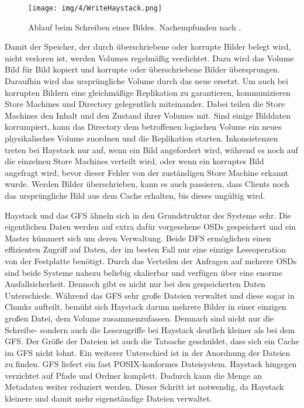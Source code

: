 \documentclass[12pt,oneside,a4paper,parskip]{scrbook}
\begin{document}
\begin{figure}[h]
  \centering
  \texttt{[image: img/4/WriteHaystack.png]}
  \caption[Ablauf beim Schreiben eines Bildes in Haystack.]{ Ablauf beim Schreiben eines Bildes. Nachempfunden nach \cite{haystack}.}
  \label{writeHaystack}
\end{figure}

Damit der Speicher, der durch überschriebene oder korrupte Bilder belegt wird, nicht verloren ist, werden Volumes regelmäßig verdichtet. Dazu wird das Volume Bild für Bild kopiert und korrupte oder überschriebene Bilder übersprungen. Daraufhin wird das ursprüngliche Volume durch das neue ersetzt. Um auch bei korrupten Bildern eine gleichmäßige Replikation zu garantieren, kommunizieren Store Machines und Directory gelegentlich miteinander. Dabei teilen die Store Machines den Inhalt und den Zustand ihrer Volumes mit. Sind einige Bilddaten korrumpiert, kann das Directory dem betroffenen logischen Volume ein neues physikalisches Volume zuordnen und die Replikation starten. Inkonsistenzen treten bei Haystack nur auf, wenn ein Bild angefordert wird, während es noch auf die einzelnen Store Machines verteilt wird, oder wenn ein korruptes Bild angefragt wird, bevor dieser Fehler von der zuständigen Store Machine erkannt wurde. Werden Bilder überschrieben, kann es auch passieren, dass Clients noch das ursprüngliche Bild aus dem Cache erhalten, bis dieses ungültig wird.

Haystack und das GFS ähneln sich in den Grundstruktur des Systeme sehr. Die eigentlichen Daten werden auf extra dafür vorgesehene OSDs gespeichert und ein Master kümmert sich um deren Verwaltung. Beide DFS ermöglichen einen effizienten Zugriff auf Daten, der im besten Fall nur eine einzige Leseoperation von der Festplatte benötigt. Durch das Verteilen der Anfragen auf mehrere OSDs sind beide Systeme nahezu beliebig skalierbar und verfügen über eine enorme Ausfallsicherheit. Dennoch gibt es nicht nur bei den gespeicherten Daten Unterschiede. Während das GFS sehr große Dateien verwaltet und diese sogar in Chunks aufteilt, bemüht sich Haystack darum mehrere Bilder in einer einzigen großen Datei, dem Volume zusammenzufassen. Demnach sind nicht nur die Schreibe- sondern auch die Lesezugriffe bei Haystack deutlich kleiner als bei dem GFS. Der Größe der Dateien ist auch die Tatsache geschuldet, dass sich ein Cache im GFS nicht lohnt. Ein weiterer Unterschied ist in der Anordnung der Dateien zu finden. GFS liefert ein fast POSIX-konformes Dateisystem. Haystack hingegen verzichtet auf Pfade und Ordner komplett. Dadurch kann die Menge an Metadaten weiter reduziert werden. Dieser Schritt ist notwendig, da Haystack kleinere und damit mehr eigenständige Dateien verwaltet. 
\end{document}
